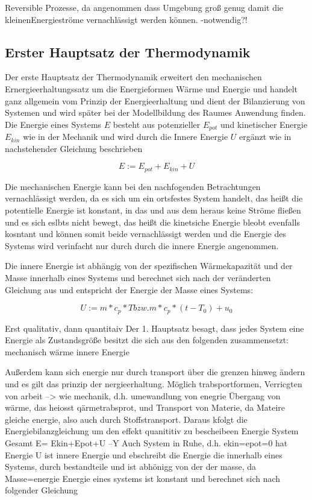 Reversible Prozesse, da angenommen dass Umgebung groß genug damit die \Gun kleinen\Gob Energieströme vernachlässigt werden können. -notwendig?!


\subsection{Erster Hauptsatz der Thermodynamik}

\cite[S.~43ff.]{ba12}
Der erste Hauptsatz der Thermodynamik erweitert den mechanischen Ernergieerhaltungssatz um die Energieformen Wärme und Energie und handelt ganz allgemein vom Prinzip der Energieerhaltung und dient der Bilanzierung von Systemen und wird später bei der Modellbildung des Raumes Anwendung finden. 
Die Energie eines Systems $E$ besteht aus potenzieller $E_{pot}$ und kinetischer Energie $E_{kin}$ wie in der Mechanik und wird durch die Innere Energie $U$ ergänzt wie in nachstehender Gleichung beschrieben \cite[S.~49]{ba12}

\begin{equation}
\label{eq:energie}
E := E_{pot} + E_{kin} + U
\end{equation}
 
Die mechanischen Energie kann bei den nachfogenden Betrachtungen vernachlässigt werden, da es sich um ein ortsfestes System handelt, das heißt die potentielle Energie ist konstant, in das und aus dem heraus keine Ströme fließen und es sich eslbts nicht bewegt, das heißt die kinetsiche Energie bleobt evenfalls kosntant und können somit beide vernachlässigt werden und die Energie des Systems wird verinfacht nur durch durch die innere Energie angenommen.



Die innere Energie ist abhängig von der spezifischen Wärmekapazität und der Masse innerhalb eines Systems und berechnet sich nach der veränderten Gleichung aus \cite[S.~54]{ba12} und entspricht der Energie der Masse eines Systems:

\begin{equation}
\label{eq:innereenergie}
U := m*c_p*T bzw. m*c_p*(t-T_0)+u_0
\end{equation}

Erst qualitativ, dann quantitaiv
Der 1. Hauptsatz besagt, dass jedes System eine Energie als Zustandsgröße besitzt die sich aus den folgenden zusammensetzt:
mechanisch
wärme
innere Energie

\cite[S.~48]{ba12}
Außerdem kann sich energie nur durch transport über die grenzen hinweg ändern und es gilt das prinzip der nergieerhaltung. Möglich trabsportformen, Verricgten von arbeit --> wie mechanik, d.h. umewandlung von enegrie
Übergang von wärme, das heiosst qärmetrabsprot, und Transport von Materie, da Mateire gleiche energie, also auch durch Stoffstransport.
Daraus kfolgt die Energiebilanzgleichung um den effekt quanititiv zu bescheibeen
Energie System Gesamt E= Ekin+Epot+U --Y Auch System in Ruhe, d.h. ekin=epot=0 hat Energie
U ist innere Energie und ebschreibt die Energie die innerhalb eines Systems, durch bestandteile und ist abhönigg von der der masse, da Masse=energie
Energie eines systems ist konstant und berechnet sich nach folgender Gleichung \cite[S.~54]{ba12}

